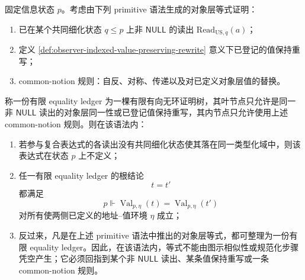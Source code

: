 \begin{proposition}\label{distill:euclid_elements-finite_construction_certificate_families-forcing-equality-ledger-normal-form}
固定信息状态 \(p\)。考虑由下列 primitive 语法生成的对象层等式证明：
\begin{enumerate}
  \item 已在某个共同细化状态 \(q\le p\) 上非 \(\mathsf{NULL}\) 的读出 \(\mathrm{Read}_{\mathrm{US},q}(a)\)；
  \item 定义 \ref{def:observer-indexed-value-preserving-rewrite} 意义下已登记的值保持重写；
  \item common-notion 规则：自反、对称、传递以及对已定义对象层值的替换。
\end{enumerate}
称一份有限 equality ledger 为一棵有限有向无环证明树，其叶节点只允许是同一非 \(\mathsf{NULL}\) 读出的对象层同一性或已登记值保持重写，其内节点只允许使用上述 common-notion 规则。则在该语法内：
\begin{enumerate}
  \item 若参与复合表达式的各读出没有共同细化状态使其落在同一类型化域中，则该表达式在状态 \(p\) 上不定义；
  \item 任一有限 equality ledger 的根结论
  \[
  t=t'
  \]
  都满足
  \[
  p\Vdash \operatorname{Val}_{p,\eta}(t)=\operatorname{Val}_{p,\eta}(t')
  \]
  对所有使两侧已定义的地址--值环境 \(\eta\) 成立；
  \item 反过来，凡是在上述 primitive 语法中推出的对象层等式，都可整理为一份有限 equality ledger。因此，在该语法内，等式不能由图示相似性或规范化步骤凭空产生；它必须回指到某个非 \(\mathsf{NULL}\) 读出、某条值保持重写或一条 common-notion 规则。
\end{enumerate}
\end{proposition}

